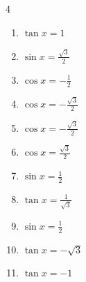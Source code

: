 \begin{multicols}{4}
\begin{enumerate}
  \item $\displaystyle \tan{x}  = 1$


  \item $\displaystyle \sin{x}  = \frac{\sqrt{3}}{2}$


  \item $\displaystyle \cos{x}  = -\frac{1}{2}$


  \item $\displaystyle \cos{x}  = -\frac{\sqrt{3}}{2}$


  \item $\displaystyle \cos{x}  = -\frac{\sqrt{3}}{2}$


  \item $\displaystyle \cos{x}  = \frac{\sqrt{3}}{2}$


  \item $\displaystyle \sin{x}  = \frac{1}{2}$


  \item $\displaystyle \tan{x}  = \frac{1}{\sqrt{3}}$


\columnbreak %

  \item $\displaystyle \sin{x}  = \frac{1}{2}$


  \item $\displaystyle \tan{x}  = -\sqrt{3}$


  \item $\displaystyle \tan{x}  = -1$



\end{enumerate}
\end{multicols}
